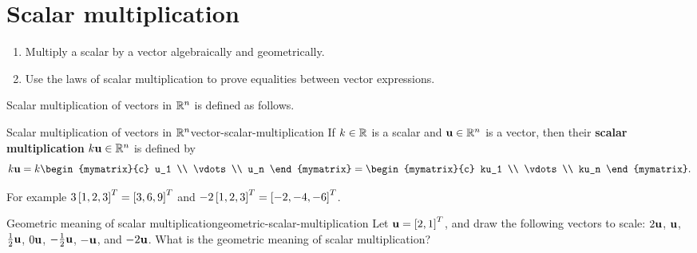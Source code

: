 \section{Scalar multiplication}

\begin{outcome}
  \begin{enumerate}
  \item Multiply a scalar by a vector algebraically and geometrically.
  \item Use the laws of scalar multiplication to prove equalities
    between vector expressions.
  \end{enumerate}
\end{outcome}

Scalar multiplication of vectors in $\mathbb{R}^n$ is defined as
follows.

\begin{definition}{Scalar multiplication of vectors in $\mathbb{R}^n$}{vector-scalar-multiplication}
  If $k\in\mathbb{R}$ is a scalar and $\vect{u}\in \R^n$ is a vector, then
  their
  \textbf{scalar multiplication}%
  $k\vect{u}\in \R^n$ is defined by
  \begin{equation*}
    k\vect{u}=k\begin{mymatrix}{c}
      u_1 \\
      \vdots \\
      u_n
    \end{mymatrix} = \begin{mymatrix}{c}
      ku_1 \\
      \vdots \\
      ku_n
    \end{mymatrix}.
  \end{equation*}
\end{definition}

For example $3 \left[ 1, 2, 3 \right]^T = \left[ 3, 6, 9 \right]^T$ and
$-2\left[ 1, 2, 3 \right]^T = \left[ -2, -4, -6 \right]^T$.

\begin{example}{Geometric meaning of scalar multiplication}{geometric-scalar-multiplication}
  Let $\vect{u}=\mat{2,1}^T$, and draw the following vectors to scale:
  $2\vect{u}$, $\vect{u}$, $\frac{1}{2}\vect{u}$, $0\vect{u}$,
  $-\frac{1}{2}\vect{u}$, $-\vect{u}$, and $-2\vect{u}$.  What is the
  geometric meaning of scalar multiplication?
\end{example}

